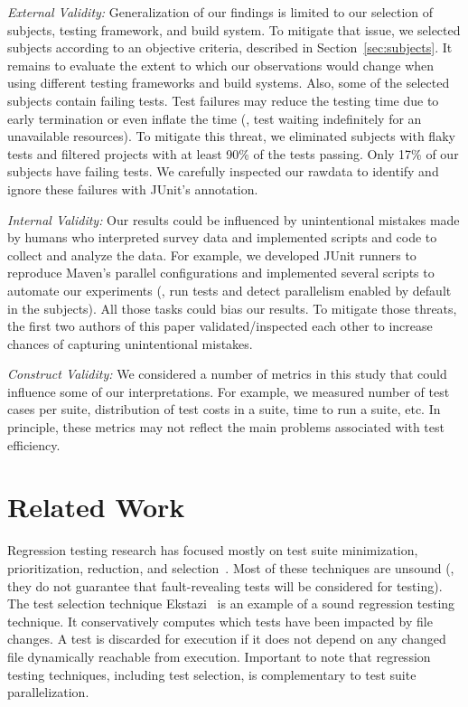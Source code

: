 \documentclass[10pt,journal,compsoc]{IEEEtran}
\begin{document}
\textit{External Validity:} Generalization of our findings is limited
to our selection of subjects, testing framework, and build system.  To
mitigate that issue, we selected subjects according to an objective
criteria, described in Section~\ref{sec:subjects}.  It remains to
evaluate the extent to which our observations would change when using
different testing frameworks and build systems.
Also, some of the selected subjects contain failing tests. Test
failures may reduce the testing time due to early termination
or even inflate the time (\eg, test waiting indefinitely for
an unavailable resources).
To mitigate this threat, we eliminated subjects with flaky tests and
filtered projects with at least 90\% of the tests passing.
Only 17\% of our subjects have failing tests.
We carefully inspected our rawdata to identify and ignore these
failures with JUnit's  annotation.

\textit{Internal Validity:} Our results could be influenced by
unintentional mistakes made by humans who interpreted survey data and
implemented scripts and code to collect and analyze the data.
For example, we developed JUnit runners to reproduce Maven's parallel
configurations and implemented several scripts to automate our
experiments (\eg, run tests and detect parallelism enabled by default
in the subjects).
All those tasks could bias our results.
To mitigate those threats, the first two authors of this paper
validated/inspected each other to increase chances of capturing
unintentional mistakes.

\textit{Construct Validity:} We considered a number of metrics in this
study that could influence some of our interpretations.  For example,
we measured number of test cases per suite, distribution of test costs
in a suite, time to run a suite, etc.  In principle, these metrics may
not reflect the main problems associated with test
efficiency.


\section{Related Work}
\label{sec:related}

Regression testing research has focused mostly on test suite
minimization, prioritization, reduction, and
selection~\cite{yoo-harman-stvr2012,soetens-etal-2016}.  Most of these
techniques are unsound (\ie{}, they do not guarantee that
fault-revealing tests will be considered for testing).  The test
selection technique
Ekstazi~\cite{gligoric-etal-issta2015,celik-etal-fse2017} is an
example of a sound regression testing technique. It conservatively
computes which tests have been impacted by file changes.  A test is
discarded for execution if it does not depend on any changed file
dynamically reachable from execution. Important
to note that regression testing techniques, including test selection,
is complementary to test suite parallelization.
\end{document}
